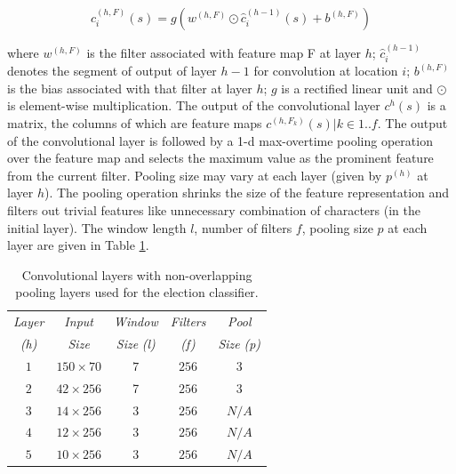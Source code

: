 \documentclass[letterpaper]{article}
\begin{document}
\begin{equation}\label{conv}c_i^{(h,F)}(s)=g(w^{(h,F)}\odot \hat{c}_i^{(h-1)}(s)+b^{(h,F)}) 
\end{equation}

where 
$w^{(h,F)}$ is the filter associated with feature map F at layer $h$; 
$\hat{c}_i^{(h-1)}$ denotes the segment of output of layer $h-1$ for convolution at location $i$; $b^{(h,F)}$ is the bias associated with that filter at layer $h$; $g$ is a rectified linear unit and $\odot$ is element-wise multiplication. The output of the convolutional layer $c^h(s)$ is a matrix, the columns of which are feature maps $c^{(h,F_k)}(s)  \vert  k \in 1..f$. The output of the convolutional layer is followed by a 1-d max-overtime pooling operation \cite{collobert2011natural} over the feature map and selects the maximum value as the prominent feature from the current filter. Pooling size may vary at each layer (given by $p^{(h)}$ at layer $h$). The pooling operation shrinks the size of the feature representation and filters out trivial features like unnecessary combination of characters (in the initial layer). The window length $l$, number of filters $f$, pooling size $p$ at each layer are given in Table \ref{layers}.


\begin{table}[h]%
\centering
\small
\begin{tabular}{ |c|c|c|c|c| }
\hline %
 \emph{Layer} & \emph{Input}  & \emph{Window}  & \emph{Filters} & \emph{Pool}  \\
\emph{(h)}& \emph{Size} & \emph{Size} \emph{(l)} & \emph{(f)}& \emph{Size} \emph{(p)} \\\hline %
$1$ & $150\times 70$ & $7$ & $256$ & $3$ \\\hline
$2$ &$42\times 256$ &7 &$256$ & $3$ \\\hline
$3$& $14\times 256$ &  $3$ & $256$ & $N/A$\\\hline
$4$ & $12\times 256$ &$3$ & $256$ & $N/A$ \\\hline
$5$& $10\times 256$ &$3$ & $256$ & $N/A$ \\\hline
\end{tabular}
\caption{Convolutional layers with non-overlapping pooling layers used for the election classifier.}
\label{layers} %
\end{table}
\end{document}
